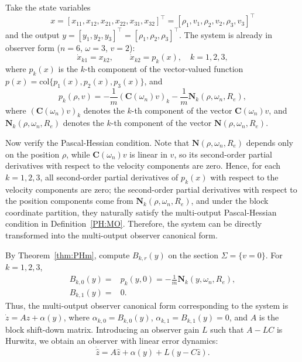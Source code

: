\documentclass[11pt]{article}
\begin{document}
Take the state variables $$x=[x_{11},x_{12},x_{21},x_{22},x_{31},x_{32}]^\top=[\rho_1,v_1,\rho_2,v_2,\rho_3,v_3]^\top$$ and the output $y=[y_1,y_2,y_3]^\top=[\rho_1,\rho_2,\rho_3]^\top$. The system is already in observer form ($n=6$, $\omega=3$, $v=2$):
\begin{equation}
	\dot{x}_{k1}=x_{k2},\qquad 
	\dot{x}_{k2}=p_k(x),\quad k=1,2,3,
\end{equation}
where $p_k(x)$ is the $k$-th component of the vector-valued function $p(x)=\mathrm{col}\{p_1(x),p_2(x),p_3(x)\}$, and
\begin{equation}
	p_k(\rho,v)=-\frac{1}{m}\left(\mathbf{C}(\omega_n)v\right)_k-\frac{1}{m}\mathbf{N}_k(\rho,\omega_n,R_e),
\end{equation}
where $\left(\mathbf{C}(\omega_n)v\right)_k$ denotes the $k$-th component of the vector $\mathbf{C}(\omega_n)v$, and $\mathbf{N}_k(\rho,\omega_n,R_e)$ denotes the $k$-th component of the vector $\mathbf{N}(\rho,\omega_n,R_e)$.

Now verify the Pascal-Hessian condition. Note that $\mathbf{N}(\rho,\omega_n,R_e)$ depends only on the position $\rho$, while $\mathbf{C}(\omega_n)v$ is linear in $v$, so its second-order partial derivatives with respect to the velocity components are zero. Hence, for each $k=1,2,3$, all second-order partial derivatives of $p_k(x)$ with respect to the velocity components are zero; the second-order partial derivatives with respect to the position components come from $\mathbf{N}_k(\rho,\omega_n,R_e)$, and under the block coordinate partition, they naturally satisfy the multi-output Pascal-Hessian condition in Definition~\ref{PH:MO}. Therefore, the system can be directly transformed into the multi-output observer canonical form.

By Theorem~\ref{thm:PHm}, compute $B_{k,r}(y)$ on the section $\Sigma=\{v=0\}$. For $k=1,2,3$,
\begin{align*}
	B_{k,0}(y)=&p_k(y,0)=-\frac{1}{m}\mathbf{N}_k(y,\omega_n,R_e),\\
	B_{k,1}(y)=&0.
\end{align*}
Thus, the multi-output observer canonical form corresponding to the system is $\dot{z}=Az+\alpha(y)$, where $\alpha_{k,0}=B_{k,0}(y)$, $\alpha_{k,1}=B_{k,1}(y)=0$, and $A$ is the block shift-down matrix. Introducing an observer gain $L$ such that $A-LC$ is Hurwitz, we obtain an observer with linear error dynamics:
\begin{equation}
	\dot{\hat{z}}=A\hat{z}+\alpha(y)+L(y-C\hat{z}).
\end{equation}
\end{document}
